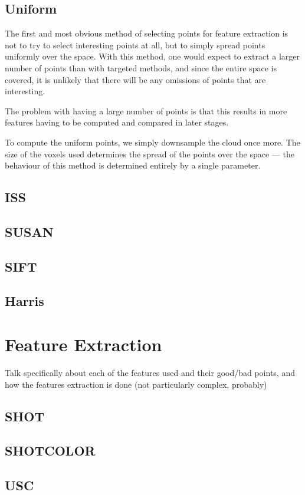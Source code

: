 \documentclass[11pt,a4paper]{kth-mag}
\begin{document}
\subsection{Uniform}
The first and most obvious method of selecting points for feature extraction is
not to try to select interesting points at all, but to simply spread points
uniformly over the space. With this method, one would expect to extract a larger
number of points than with targeted methods, and since the entire space is
covered, it is unlikely that there will be any omissions of points that are
interesting.

The problem with having a large number of points is that this results in more
features having to be computed and compared in later stages.

To compute the uniform points, we simply downsample the cloud once more. The
size of the voxels used determines the spread of the points over the space ---
the behaviour of this method is determined entirely by a single parameter.
\subsection{ISS}
\subsection{SUSAN}
\subsection{SIFT}
\subsection{Harris}
\section{Feature Extraction}
Talk specifically about each of the features used and their good/bad points, and
how the features extraction is done (not particularly complex, probably)
\subsection{SHOT}
\subsection{SHOTCOLOR}
\subsection{USC}
\end{document}
